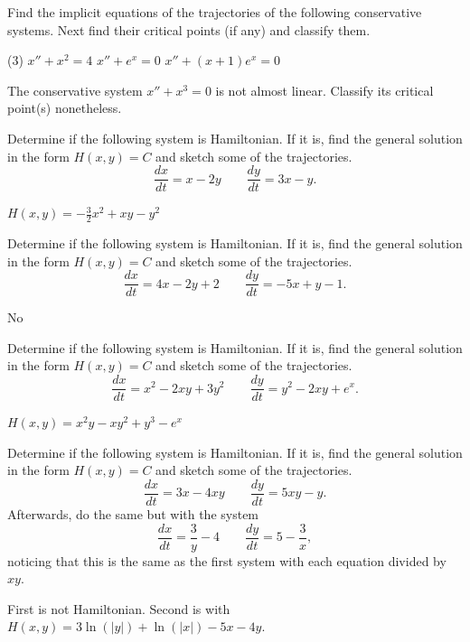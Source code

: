 \begin{exercise}\ansMark%
Find the implicit equations of the trajectories of the following
conservative systems.  Next find their critical points (if any) and classify them.
\begin{tasks}(3)
\task $x''+ x^2 = 4$
\task $x''+ e^x = 0$
\task $x''+ (x+1)e^x = 0$
\end{tasks}
\end{exercise}


\begin{exercise}\ansMark%
The conservative system $x''+x^3 = 0$ is not almost linear.  Classify
its critical point(s) nonetheless.
\end{exercise}

\begin{exercise}
Determine if the following system is Hamiltonian. If it is, find the general solution in the form $H(x,y) = C$ and sketch some of the trajectories.
\[ \frac{dx}{dt} = x - 2y \qquad \frac{dy}{dt} = 3x - y.\]
\end{exercise}
\comboSol{%
}
{%
$H(x,y) = -\frac{3}{2}x^2 + xy - y^2$
}

\begin{exercise}
Determine if the following system is Hamiltonian. If it is, find the general solution in the form $H(x,y) = C$ and sketch some of the trajectories.
\[ \frac{dx}{dt} = 4x - 2y + 2 \qquad \frac{dy}{dt} = -5x + y - 1.\]
\end{exercise}
\comboSol{%
}
{%
No
}


\begin{exercise}
Determine if the following system is Hamiltonian. If it is, find the general solution in the form $H(x,y) = C$ and sketch some of the trajectories.
\[ \frac{dx}{dt} = x^2 - 2xy + 3y^2 \qquad \frac{dy}{dt} = y^2 - 2xy + e^x .\]
\end{exercise}
\comboSol{%
}
{%
$H(x,y) = x^2y - xy^2 + y^3 - e^x$
}


\begin{exercise}
Determine if the following system is Hamiltonian. If it is, find the general solution in the form $H(x,y) = C$ and sketch some of the trajectories.
\[ \frac{dx}{dt} = 3x - 4xy \qquad \frac{dy}{dt} = 5xy - y.\]
Afterwards, do the same but with the system 
\[ \frac{dx}{dt} = \frac{3}{y} - 4 \qquad \frac{dy}{dt} = 5 - \frac{3}{x}, \] noticing that this is the same as the first system with each equation divided by $xy$.
\end{exercise}
\comboSol{%
}
{%
First is not Hamiltonian. Second is with $H(x,y) = 3\ln(|y|)  + \ln(|x|) - 5x - 4y$.
}

